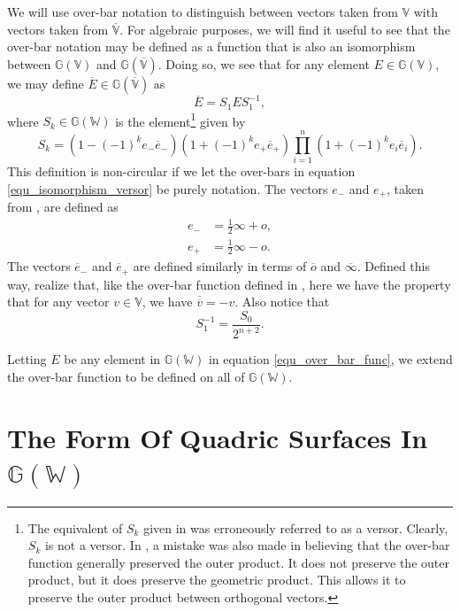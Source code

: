 \documentclass{birkjour}
\theoremstyle{definition}
\theoremstyle{remark}
\numberwithin{equation}{section}
\newcommand{\G}{\mathbb{G}}
\newcommand{\V}{\mathbb{V}}
\newcommand{\Vb}{\mathbb{\overline{V}}}
\newcommand{\W}{\mathbb{W}}
\newcommand{\nvao}{o}
\newcommand{\nvai}{\infty}
\newcommand{\nvaob}{\overline{o}}
\newcommand{\nvaib}{\overline{\infty}}
\newcommand{\eminus}{e_{-}}
\newcommand{\eplus}{e_{+}}
\newcommand{\eminusb}{\overline{e}_{-}}
\newcommand{\eplusb}{\overline{e}_{+}}
\begin{document}
We will use over-bar notation to distinguish between vectors taken from $\V$
with vectors taken from $\Vb$.  For algebraic purposes, we will find it useful
to see that the over-bar notation may be defined as a function
that is also an isomorphism between $\G(\V)$ and $\G(\Vb)$.
Doing so, we see that for any element $E\in\G(\V)$,
we may define $\overline{E}\in\G(\Vb)$ as
\begin{equation}\label{equ_over_bar_func}
\overline{E} = S_1ES_1^{-1},
\end{equation}
where $S_k\in\G(\W)$ is the element\footnote{The equivalent of $S_k$ given in \cite{Parkin12}
was erroneously referred to as a versor.  Clearly, $S_k$ is not a versor.  In \cite{Parkin12},
a mistake was also made in believing that the over-bar function generally preserved the outer product.
It does not preserve the outer product, but it does preserve the geometric product.
This allows it to preserve the outer product between orthogonal vectors.} given by
\begin{equation}\label{equ_isomorphism_versor}
S_k = (1-(-1)^k\eminus\eminusb)(1+(-1)^k\eplus\eplusb)\prod_{i=1}^n(1+(-1)^ke_i\overline{e}_i).
\end{equation}
This definition is non-circular if we let the over-bars in equation \eqref{equ_isomorphism_versor}
be purely notation.  The vectors $\eminus$ and $\eplus$, taken from \cite{LiRockwood},
are defined as
\begin{align}
\eminus &= \frac{1}{2}\nvai + \nvao, \\
\eplus &= \frac{1}{2}\nvai - \nvao.
\end{align}
The vectors $\eminusb$ and $\eplusb$ are defined similarly in terms of $\nvaob$ and $\nvaib$.
Defined this way, realize that, like the over-bar function defined in \cite{Parkin12},
here we have the property that for any vector $v\in\V$, we have $\overline{\overline{v}}=-v$.
Also notice that
\begin{equation}
S_1^{-1} = \frac{S_0}{2^{n+2}}.
\end{equation}

Letting $E$ be any element in $\G(\W)$ in equation \eqref{equ_over_bar_func},
we extend the over-bar function to be defined on all of $\G(\W)$.

\section{The Form Of Quadric Surfaces In $\G(\W)$}
\end{document}
